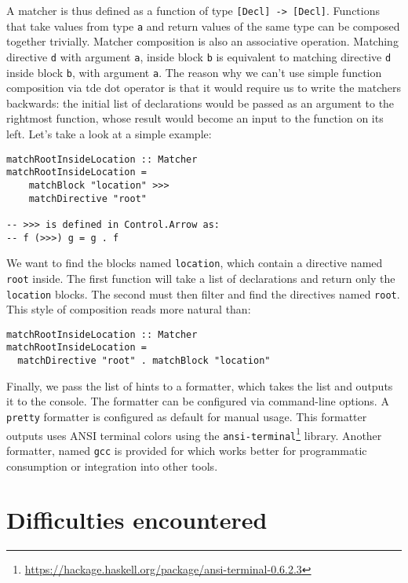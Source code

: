 \documentclass[]{article}
\begin{document}
A matcher is thus defined as a function of type \texttt{[Decl] -> [Decl]}.
Functions that take values from type \texttt{a} and return values of 
the same type can be composed together trivially. Matcher composition
is also an associative operation. Matching directive \texttt{d} with
argument \texttt{a}, inside block \texttt{b} is equivalent to matching
directive \texttt{d} inside block \texttt{b}, with argument \texttt{a}.
The reason why we can't use simple function composition via
tde dot operator is that it would require us to write the matchers
backwards: the initial list of declarations would be passed as an argument to the
rightmost function, whose result would become an input to the
function on its left. Let's take a look at a simple example:

\begin{lstlisting}
matchRootInsideLocation :: Matcher
matchRootInsideLocation =
    matchBlock "location" >>>
    matchDirective "root"

-- >>> is defined in Control.Arrow as:
-- f (>>>) g = g . f
\end{lstlisting}

We want to find the blocks named \texttt{location}, which contain a directive
named \texttt{root} inside. The first function will take a list of declarations
and return only the \texttt{location} blocks. The second must then filter and find
the directives named \texttt{root}. This style of composition reads more
natural than:

\begin{lstlisting}
matchRootInsideLocation :: Matcher
matchRootInsideLocation =
  matchDirective "root" . matchBlock "location"
\end{lstlisting}

Finally, we pass the list of hints to a formatter, which takes the
list and outputs it to the console. The formatter can be configured
via command-line options. A \texttt{pretty} formatter is configured
as default for manual usage. This formatter outputs uses ANSI terminal
colors using the \texttt{ansi-terminal}\footnote{\url{https://hackage.haskell.org/package/ansi-terminal-0.6.2.3}}
library. Another formatter, named \texttt{gcc} is provided for
which works better for programmatic consumption or integration into other
tools.

\section{Difficulties encountered}\label{difficulties-encountered}
\end{document}
